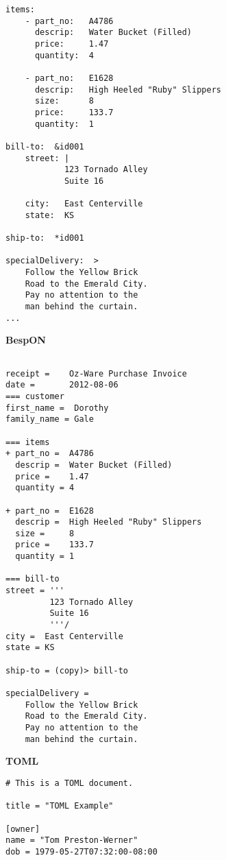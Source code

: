 \documentclass[11pt]{article}
\begin{document}
{{\begin{appendices}
\begin{tcolorbox}{}
\begin{multicols}{2}
\begin{Verbatim}[formatcom=\color{DarkGreen}]
items:
    - part_no:   A4786
      descrip:   Water Bucket (Filled)
      price:     1.47
      quantity:  4

    - part_no:   E1628
      descrip:   High Heeled "Ruby" Slippers
      size:      8
      price:     133.7
      quantity:  1

bill-to:  &id001
    street: |
            123 Tornado Alley
            Suite 16
    
    city:   East Centerville
    state:  KS

ship-to:  *id001

specialDelivery:  >
    Follow the Yellow Brick
    Road to the Emerald City.
    Pay no attention to the
    man behind the curtain.
...
\end{Verbatim}
\columnbreak
\centering \textbf{BespON}

\begin{Verbatim}

receipt =    Oz-Ware Purchase Invoice
date =       2012-08-06
=== customer
first_name =  Dorothy
family_name = Gale

=== items
+ part_no =  A4786
  descrip =  Water Bucket (Filled)
  price =    1.47
  quantity = 4

+ part_no =  E1628
  descrip =  High Heeled "Ruby" Slippers
  size =     8
  price =    133.7
  quantity = 1

=== bill-to
street = '''
         123 Tornado Alley
         Suite 16
         '''/
city =  East Centerville
state = KS

ship-to = (copy)> bill-to

specialDelivery =
    Follow the Yellow Brick
    Road to the Emerald City.
    Pay no attention to the
    man behind the curtain.

\end{Verbatim}
\end{multicols}
\end{tcolorbox}




\begin{tcolorbox}{}
\begin{multicols}{2}

\centering \textbf{TOML}
\begin{Verbatim}[formatcom=\color{DarkGreen}]
# This is a TOML document.

title = "TOML Example"

[owner]
name = "Tom Preston-Werner"
dob = 1979-05-27T07:32:00-08:00


\end{Verbatim}
\end{multicols}
\end{tcolorbox}
\end{appendices}}}
\end{document}
